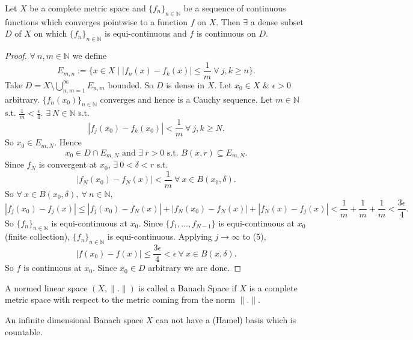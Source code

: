 \documentclass{functionspaces}
\begin{document}
\begin{theorem}
Let $X$ be a complete metric space and $\{f_{n}\}_{n\in\mathbb{N}}$ be a sequence of continuous functions which converges pointwise to a function $f$ on $X$. Then $\exists$ a dense subset $D$ of $X$ on which $\{f_{n}\}_{n\in\mathbb{N}}$ is equi-continuous and $f$ is continuous on $D$.
\end{theorem}

\begin{proof}
$\forall\ n,m\in\mathbb{N}$ we define
\[
E_{m,n}:=\Big\{x\in X\mid|f_{n}(x)-f_{k}(x)|\leq\frac{1}{m}\ \forall\ j,k\geq n\Big\}.
\]
Take $D=X\setminus\bigcup_{n,m=1}^{\infty}E_{n,m}$ bounded. So $D$ is dense in $X$. Let $x_{0}\in X$ \& $\epsilon>0$ arbitrary. $\{f_{n}(x_{0})\}_{n\in\mathbb{N}}$ converges and hence is a Cauchy sequence. Let $m\in\mathbb{N}$ s.t. $\frac{1}{m}<\frac{\epsilon}{4}$. $\exists\ N\in\mathbb{N}$ s.t.
\[
|f_{j}(x_{0})-f_{k}(x_{0})|<\frac{1}{m}\ \forall\ j,k\geq N.
\]
So $x_{0}\in E_{m,N}$. Hence
\[
x_{0}\in D\cap E_{m,N}\text{ and }\exists\ r>0\text{ s.t. }B(x,r)\subseteq E_{m,N}.
\]
Since $f_{N}$ is convergent at $x_{0}$, $\exists\ 0<\delta<r$ s.t.
\[
|f_{N}(x_{0})-f_{N}(x)|<\frac{1}{m}\ \forall\ x\in B(x_{0},\delta).
\]
So $\forall\ x\in B(x_{0},\delta),\ \forall\ n\in\mathbb{N}$,
\[
|f_{j}(x_{0})-f_{j}(x)|\leq|f_{j}(x_{0})-f_{N}(x)|+|f_{N}(x_{0})-f_{N}(x)|+|f_{N}(x)-f_{j}(x)|<\frac{1}{m}+\frac{1}{m}+\frac{1}{m}<\frac{3\epsilon}{4}. \tag{5}
\]
So $\{f_{n}\}_{n\in\mathbb{N}}$ is equi-continuous at $x_{0}$. Since $\{f_{1},\ldots,f_{N-1}\}$ is equi-continuous at $x_{0}$ (finite collection), $\{f_{n}\}_{n\in\mathbb{N}}$ is equi-continuous. Applying $j\rightarrow\infty$ to (5),
\[
|f(x_{0})-f(x)|\leq\frac{3\epsilon}{4}<\epsilon\ \forall\ x\in B(x,\delta).
\]
So $f$ is continuous at $x_{0}$. Since $x_{0}\in D$ arbitrary we are done.
\end{proof}

\begin{definition}
A normed linear space $(X,\|.\|)$ is called a Banach Space if $X$ is a complete metric space with respect to the metric coming from the norm $\|.\|$.
\end{definition}

\begin{theorem}
An infinite dimensional Banach space $X$ can not have a (Hamel) basis which is countable.
\end{theorem}
\end{document}
